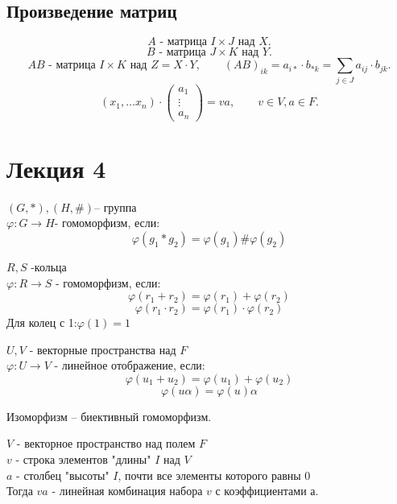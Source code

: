\documentclass[12pt]{report}
\begin{document}
\subsection{Произведение матриц}
\[
    A \mbox{ - матрица } I\times J \mbox{ над } X
.\] 
\[
    B \mbox{ - матрица } J\times K \mbox{ над } Y
.\] 
\[
    AB \mbox{ - матрица } I\times K \mbox{ над } Z = X \cdot Y, \qquad (AB)_{ik} = a_{i*} \cdot b_{*k} = \sum\limits_{j\in J} a_{ij} \cdot b_{jk}
.\] 
\[
(x_1, \ldots x_n) \cdot \left ( \begin{array}{c}a_1\\ \vdots\\ a_n \end{array}\right )=va, \qquad v \in V, a \in F
.\] 
\section{Лекция 4}
\begin{defn}
$(G, *), (H, \#) $-- группа \\
$\varphi: G \to H $- гомоморфизм, если: 
$$\varphi (g_1 * g_2) = \varphi(g_1) \# \varphi(g_2)$$
\end{defn}

\begin{defn}
$R, S$ -кольца\\
$\varphi: R\to S$ - гомоморфизм, если:
$$\varphi(r_1 + r_2) = \varphi(r_1) + \varphi(r_2)$$ 
$$\varphi(r_1 \cdot r_2) = \varphi(r_1) \cdot \varphi(r_2)$$
Для колец с 1:$\varphi(1) = 1$
\end{defn}

\begin{defn}
$U, V$ - векторные пространства над $F$\\
$\varphi: U \to V$ - линейное отображение, если:
$$\varphi(u_1 + u_2) = \varphi(u_1) + \varphi(u_2)$$
$$\varphi(u \alpha) = \varphi(u) \alpha$$
\end{defn}

\begin{note}
Изоморфизм -- биективный гомоморфизм.
\end{note}

\begin{defn}
$V$ - векторное пространство над полем $F$\\
$v$ - строка элементов "длины" $I$ над $V$\\
$a$ - столбец "высоты" $I$, почти все элементы которого равны 0\\
Тогда $va$ - линейная комбинация набора $v$ с коэффициентами $а$.\\
\end{defn}
\end{document}
